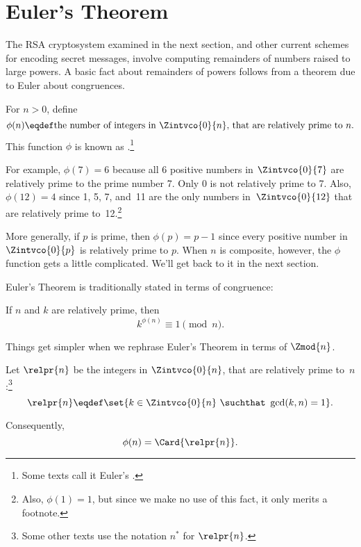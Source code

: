 \section{Euler's Theorem}\label{Euler_sec}

The RSA cryptosystem examined in the next section, and other current
schemes for encoding secret messages, involve computing remainders of
numbers raised to large powers.  A basic fact about remainders of
powers follows from a theorem due to Euler about congruences.

\begin{definition}
For $n>0$, define
\[
\phi(n) \eqdef \text{the number of integers in $\Zintvco{0}{n}$, that are relatively prime
  to~$n$.}
\]
This function $\phi$ is known as .\footnote{Some texts call it Euler's .}
\end{definition}

For example, $\phi(7) = 6$ because all 6 positive numbers in
$\Zintvco{0}{7}$ are relatively prime to the prime number 7.  Only 0
is not relatively prime to 7.  Also, $\phi(12) = 4$ since 1, 5, 7,
and~11 are the only numbers in~$\Zintvco{0}{12}$ that are relatively
prime to~12.\footnote{Also, $\phi(1)=1$, but since we make no use of
  this fact, it only merits a footnote.}

More generally, if $p$ is prime, then $\phi(p) = p - 1$ since every
positive number in $\Zintvco{0}{p}$ is relatively prime to $p$.  When
$n$ is composite, however, the $\phi$ function gets a little
complicated.  We'll get back to it in the next section.

Euler's Theorem is traditionally stated in terms of congruence:
\begin{theorem*}
If $n$ and $k$ are relatively prime, then
\begin{equation}\label{cong:euler}
k^{\phi(n)} \equiv 1 \pmod{n}.
\end{equation}
\end{theorem*}

Things get simpler when we rephrase Euler's Theorem in terms of
$\Zmod{n}$.

\begin{definition}
Let $\relpr{n}$  be the integers in $\Zintvco{0}{n}$, that are relatively
  prime to~$n$:\footnote{Some other texts use the notation $n^*$ for
  $\relpr{n}$.}
\begin{equation}\label{def:relpr}
\relpr{n} \eqdef \set{k \in \Zintvco{0}{n}\ \suchthat\ \gcd(k,n) = 1}.
\end{equation}
\end{definition}
Consequently,
\[
\phi(n) = \Card{\relpr{n}}.
\]

